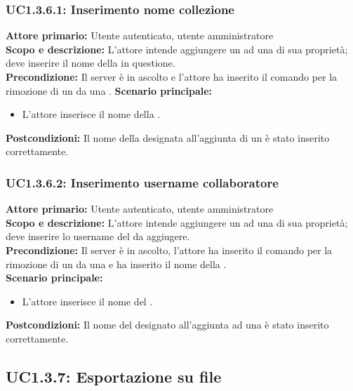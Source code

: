 \documentclass{scalatekids-article}
\begin{document}
\subsubsection{UC1.3.6.1: Inserimento nome collezione}

\textbf{Attore primario:} Utente autenticato, utente amministratore\\
\textbf{Scopo e descrizione:} L'attore intende aggiungere un  ad una  di sua proprietà; deve inserire il nome della  in questione.\\
\textbf{Precondizione:} Il server è in ascolto e l'attore ha inserito il comando per la rimozione di un  da una .
\textbf{Scenario principale:}
\begin{itemize}
\item L'attore inserisce il nome della .
\end{itemize}
\textbf{Postcondizioni:} Il nome della  designata all'aggiunta di un  è stato inserito correttamente.

\subsubsection{UC1.3.6.2: Inserimento username collaboratore}

\textbf{Attore primario:} Utente autenticato, utente amministratore\\
\textbf{Scopo e descrizione:} L'attore intende aggiungere un  ad una  di sua proprietà; deve inserire lo username del  da aggiugere.\\
\textbf{Precondizione:} Il server è in ascolto, l'attore ha inserito il comando per la rimozione di un  da una  e ha inserito il nome della .\\
\textbf{Scenario principale:}
\begin{itemize}
\item L'attore inserisce il nome del .
\end{itemize}
\textbf{Postcondizioni:} Il nome del  designato all'aggiunta ad una  è stato inserito correttamente.

\subsection{UC1.3.7: Esportazione su file}
\end{document}
